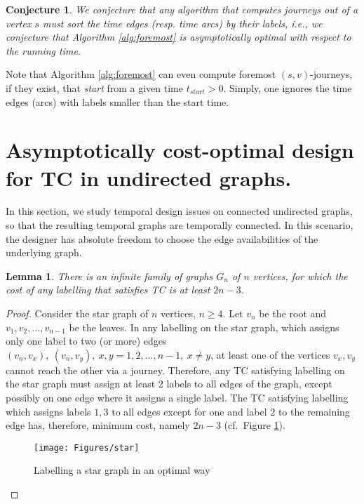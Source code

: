 \documentclass[a4paper,UKenglish]{article}
\newtheorem{lemma}{Lemma}
\newtheorem*{conjecture*}{Conjecture}
\begin{document}
\begin{conjecture*}
We conjecture that any algorithm that computes journeys out of a vertex $s$ must sort the time edges (resp. time arcs) by their labels, i.e., we conjecture that Algorithm \ref{alg:foremost} is asymptotically optimal with respect to the running time.
\end{conjecture*}

Note that Algorithm \ref{alg:foremost} can even compute foremost $(s,v)$-journeys, if they exist, that \emph{start} from a given time $t_{start}>0$. Simply, one ignores the time edges (arcs) with labels smaller than the start time.






\section{Asymptotically cost-optimal design for TC in undirected graphs.}\label{sec:cost_opt_design}
In this section, we study temporal design issues on connected undirected graphs, so that the resulting temporal graphs are temporally connected. In this scenario, the designer has absolute freedom to choose the edge availabilities of the underlying graph.

\begin{lemma}\label{thm:star}
There is an infinite family of graphs $G_n$ of $n$ vertices, for which the cost of any labelling that satisfies TC is at least $2n-3$.
\end{lemma}
\begin{proof}
Consider the star graph of $n$ vertices, $n\geq 4$. Let $v_n$ be the root and $v_1, v_2, \ldots, v_{n-1}$ be the leaves. In any labelling on the star graph, which assigns only one label to two (or more) edges $(v_n, v_x),~(v_n,v_y),~x,y=1,2,\ldots,n-1,~x\not=y$, at least one of the vertices $v_x,v_y$ cannot reach the other via a journey. Therefore, any TC satisfying labelling on the star graph must assign at least $2$ labels to all edges of the graph, except possibly on one edge where it assigns a single label. The TC satisfying labelling which assigns labels $1,3$ to all edges except for one and label $2$ to the remaining edge has, therefore, minimum cost, namely $2n-3$ (cf.~Figure \ref{fig:star}). 

\begin{figure}[!htb]
\centering
\texttt{[image: Figures/star]}
\caption{Labelling a star graph in an optimal way}
\label{fig:star}
\end{figure}
\end{proof}
\end{document}
